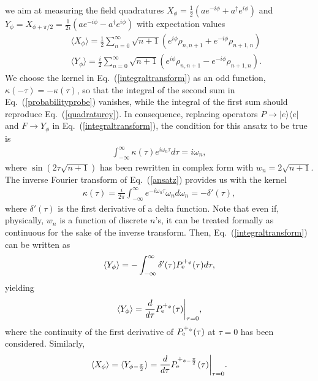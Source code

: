 \documentclass[pra,aps,twocolumn,showpacs]{revtex4}
\begin{document}
we aim at measuring the field quadratures $X_{\phi} = \frac{1}{2}
( a e^{-i \phi} + a^{\dagger} e^{i \phi} )$ and $Y_{\phi} =
X_{\phi + \pi / 2} = \frac{1}{2i} ( a e^{-i \phi} - a^{\dagger}
e^{i \phi} )$ with expectation values
\begin{eqnarray}
\label{quadraturex} && \!\!\!\!\!\!\!\!\!\!\!\! \langle X_{\phi}
\rangle = \frac{1}{2} \sum^{\infty}_{n=0} \sqrt{n+1}(e^{i \phi
}\rho_{n , n+1} + e^{-i \phi}\rho_{n+1 , n}) \\
\label{quadraturey} && \!\!\!\!\!\!\!\!\!\!\! \langle Y_{\phi}
\rangle = \frac{i}{2} \sum^{\infty}_{n=0} \sqrt{n+1} (e^{i
\phi}\rho_{n , n+1} - e^{- i \phi}\rho_{n+1 , n}) .
\end{eqnarray}
We choose the kernel in Eq.~(\ref{integraltransform}) as an odd
function, $\kappa ( -\tau ) = - \kappa (\tau)$, so that the
integral of the second sum in Eq.~(\ref{probabilityprobe})
vanishes, while the integral of the first sum should reproduce
Eq.~(\ref{quadraturey}). In consequence, replacing operators $P
\rightarrow | e \rangle \langle e |$ and $F \rightarrow Y_{\phi}$
in Eq.~(\ref{integraltransform}), the condition for this ansatz to
be true is
\begin{eqnarray}
\label{ansatz} \int_{-\infty}^{\infty} \kappa (\tau) e^{i \omega_n
\tau} d \tau = i \omega_n ,
\end{eqnarray}
where $\sin(2 \tau \sqrt{n + 1})$ has been rewritten in complex
form with $w_n = 2 \sqrt{n + 1}$. The inverse Fourier transform of
Eq.~(\ref{ansatz}) provides us with the kernel
\begin{eqnarray}
\label{kernel} \kappa (\tau) = \frac{i}{2 \pi}
\int_{-\infty}^{\infty} e^{-i \omega_n \tau} \omega_n d \omega_n =
- \delta'(\tau) ,
\end{eqnarray}
where $\delta'(\tau)$ is the first derivative of a delta function.
Note that even if, physically, $w_n$ is a function of discrete
$n$'s, it can be treated formally as continuous for the sake of
the inverse transform. Then, Eq.~(\ref{integraltransform}) can be
written as
\begin{eqnarray}
\langle Y_{\phi} \rangle = - \int_{-\infty}^{\infty} \delta'
(\tau) P_{\rm e}^{+_{\phi}} (\tau) d \tau ,
\end{eqnarray}
yielding
\begin{eqnarray}
\label{firstresulty} \langle Y_{\phi} \rangle = \frac{d}{d \tau}
P_{\rm e}^{+_{\phi}} (\tau) \bigg\vert_{\tau = 0} ,
\end{eqnarray}
where the continuity of the first derivative of $P_{\rm
e}^{+_{\phi}} (\tau)$ at $\tau = 0$ has been considered.
Similarly,
\begin{eqnarray}
\label{firstresultx} \langle X_{\phi} \rangle = \langle Y_{\phi -
\frac{\pi}{2}} \rangle =\frac{d}{d \tau} P_{\rm e}^{+_{\phi -
\frac{\pi}{2}}} (\tau) \bigg\vert_{\tau = 0} .
\end{eqnarray}
\end{document}
